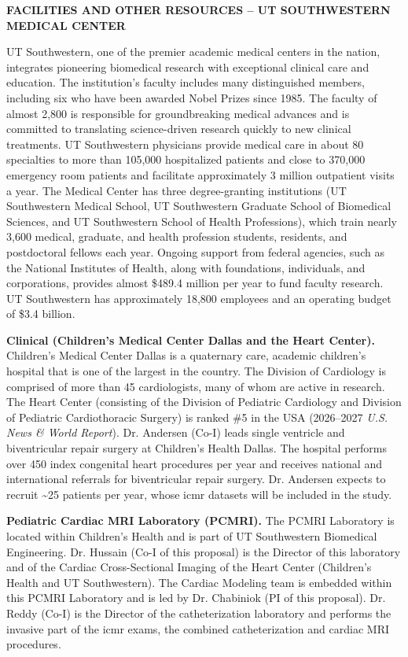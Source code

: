 \documentclass[11pt]{article}
\begin{document}
\textbf{\uppercase{Facilities and Other Resources -- UT Southwestern Medical Center}}

UT Southwestern, one of the premier academic medical centers in the nation, integrates pioneering biomedical research with exceptional clinical care and education. The institution's faculty includes many distinguished members, including six who have been awarded Nobel Prizes since 1985. The faculty of almost 2,800 is responsible for groundbreaking medical advances and is committed to translating science-driven research quickly to new clinical treatments. UT Southwestern physicians provide medical care in about 80 specialties to more than 105,000 hospitalized patients and close to 370,000 emergency room patients and facilitate approximately 3 million outpatient visits a year. The Medical Center has three degree-granting institutions (UT Southwestern Medical School, UT Southwestern Graduate School of Biomedical Sciences, and UT Southwestern School of Health Professions), which train nearly 3,600 medical, graduate, and health profession students, residents, and postdoctoral fellows each year. Ongoing support from federal agencies, such as the National Institutes of Health, along with foundations, individuals, and corporations, provides almost \$489.4 million per year to fund faculty research. UT Southwestern has approximately 18,800 employees and an operating budget of \$3.4 billion.

\textbf{Clinical (Children's Medical Center Dallas and the Heart Center).} Children's Medical Center Dallas is a quaternary care, academic children's hospital that is one of the largest in the country. The Division of Cardiology is comprised of more than 45 cardiologists, many of whom are active in research. The Heart Center (consisting of the Division of Pediatric Cardiology and Division of Pediatric Cardiothoracic Surgery) is ranked \#5 in the USA (2026--2027 {\it U.S. News \& World Report}). Dr. Andersen (Co-I) leads single ventricle and biventricular repair surgery at Children's Health Dallas. The hospital performs over 450 index congenital heart procedures per year and receives national and international referrals for biventricular repair surgery. Dr. Andersen expects to recruit \textasciitilde{}25 patients per year, whose \gls*{icmr} datasets will be included in the study.

\textbf{Pediatric Cardiac MRI Laboratory (PCMRI).} The PCMRI Laboratory is located within Children's Health and is part of UT Southwestern Biomedical Engineering. Dr. Hussain (Co-I of this proposal) is the Director of this laboratory and of the Cardiac Cross-Sectional Imaging of the Heart Center (Children's Health and UT Southwestern). The Cardiac Modeling team is embedded within this PCMRI Laboratory and is led by Dr. Chabiniok (PI of this proposal). Dr. Reddy (Co-I) is the Director of the catheterization laboratory and performs the invasive part of the \gls*{icmr} exams, the combined catheterization and cardiac MRI procedures.
\end{document}
